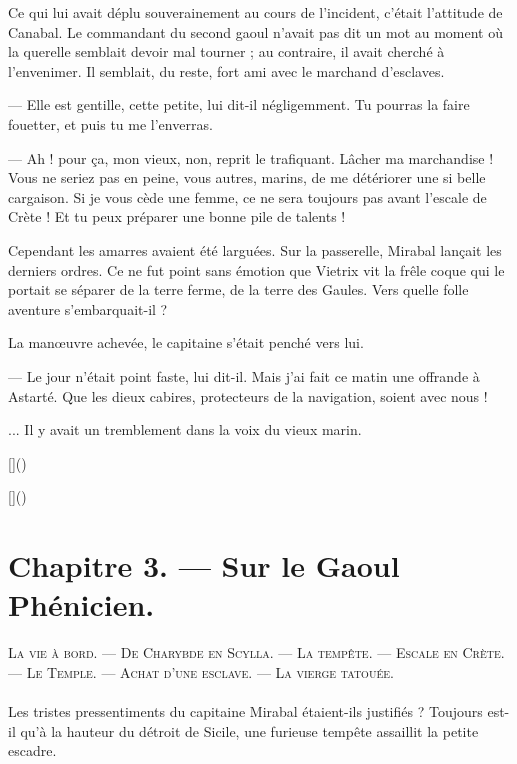 \documentclass[a4paper, 11pt, oneside, polutonikogreek, french]{article}
\begin{document}
Ce qui lui avait déplu souverainement au cours de l'incident, c'était l'attitude de Canabal. Le commandant du second gaoul n'avait pas dit un mot au moment où la querelle semblait devoir mal tourner ; au contraire, il avait cherché à l'envenimer. Il semblait, du reste, fort ami avec le marchand d'esclaves.

--- Elle est gentille, cette petite, lui dit-il négligemment. Tu pourras la faire fouetter, et puis tu me l'enverras.

--- Ah ! pour ça, mon vieux, non, reprit le trafiquant. Lâcher ma marchandise ! Vous ne seriez pas en peine, vous autres, marins, de me détériorer une si belle cargaison. Si je vous cède une femme, ce ne sera toujours pas avant l'escale de Crète ! Et tu peux préparer une bonne pile de talents !

\bigskip
\centerline{\EightStarTaper}
\centerline{\EightStarTaper\EightStarTaper}
\bigskip

Cependant les amarres avaient été larguées. Sur la passerelle, Mirabal lançait les derniers ordres. Ce ne fut point sans émotion que Vietrix vit la frêle coque qui le portait se séparer de la terre ferme, de la terre des Gaules. Vers quelle folle aventure s'embarquait-il ?

La manœuvre achevée, le capitaine s'était penché vers lui.

--- Le jour n'était point faste, lui dit-il. Mais j'ai fait ce matin une offrande à Astarté. Que les dieux cabires, protecteurs de la navigation, soient avec nous !

... Il y avait un tremblement dans la voix du vieux marin.

[]()

[]()
\clearpage
\section{Chapitre 3. --- Sur le Gaoul Phénicien.}
\begin{center}
\scshape
\small
La vie à bord. --- De Charybde en Scylla. --- La tempête. --- Escale en Crète. --- Le Temple. --- Achat d'une esclave. --- La vierge tatouée.
\end{center}
\paragraph{}
Les tristes pressentiments du capitaine Mirabal étaient-ils justifiés ? Toujours est-il qu'à la hauteur du détroit de Sicile, une furieuse tempête assaillit la petite escadre.
\end{document}
